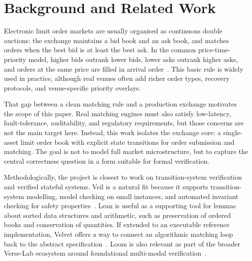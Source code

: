 \section{Background and Related Work}

Electronic limit order markets are usually organised as continuous double
auctions: the exchange maintains a bid book and an ask book, and matches orders
when the best bid is at least the best ask. In the common price-time-priority
model, higher bids outrank lower bids, lower asks outrank higher asks, and
orders at the same price are filled in arrival order~\cite{harris}. This basic
rule is widely used in practice, although real venues often add richer order
types, recovery protocols, and venue-specific priority overlays.

That gap between a clean matching rule and a production exchange motivates the
scope of this paper. Real matching engines must also satisfy low-latency,
fault-tolerance, auditability, and regulatory requirements, but those concerns
are not the main target here. Instead, this work isolates the exchange core:
a single-asset limit order book with explicit state transitions for order
submission and matching. The goal is not to model full market microstructure,
but to capture the central correctness question in a form suitable for formal
verification.

Methodologically, the project is closest to work on transition-system
verification and verified stateful systems. Veil is a natural fit because it
supports transition-system modelling, model checking on small instances, and
automated invariant checking for safety properties~\cite{veilpost}. Lean is
useful as a supporting tool for lemmas about sorted data structures and
arithmetic, such as preservation of ordered books and conservation of
quantities. If extended to an executable reference implementation, Velvet
offers a way to connect an algorithmic matching loop back to the abstract
specification~\cite{velvetpost}. Loom is also relevant as part of the broader
Verse-Lab ecosystem around foundational multi-modal verification~\cite{loom}.
